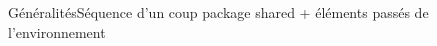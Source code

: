 \begin{frame}{Généralités}{Séquence d'un coup}
package shared + éléments passés de l'environnement
\end{frame}

